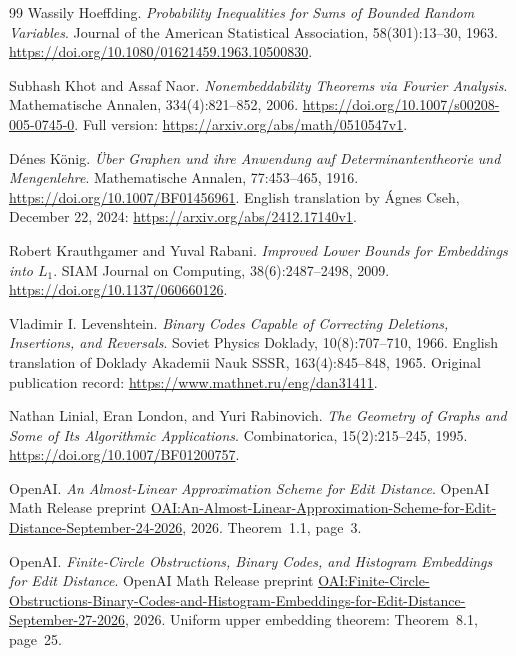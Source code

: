 \begin{thebibliography}{99}
Wassily Hoeffding.
\emph{Probability Inequalities for Sums of Bounded Random Variables}.
Journal of the American Statistical Association, 58(301):13--30, 1963.
\url{https://doi.org/10.1080/01621459.1963.10500830}.

Subhash Khot and Assaf Naor.
\emph{Nonembeddability Theorems via Fourier Analysis}.
Mathematische Annalen, 334(4):821--852, 2006.
\url{https://doi.org/10.1007/s00208-005-0745-0}.
Full version: \url{https://arxiv.org/abs/math/0510547v1}.

D\'enes K\"onig.
\emph{\"Uber Graphen und ihre Anwendung auf Determinantentheorie und Mengenlehre}.
Mathematische Annalen, 77:453--465, 1916.
\url{https://doi.org/10.1007/BF01456961}.
English translation by \'Agnes Cseh, December 22, 2024:
\url{https://arxiv.org/abs/2412.17140v1}.

Robert Krauthgamer and Yuval Rabani.
\emph{Improved Lower Bounds for Embeddings into $L_1$}.
SIAM Journal on Computing, 38(6):2487--2498, 2009.
\url{https://doi.org/10.1137/060660126}.

Vladimir I. Levenshtein.
\emph{Binary Codes Capable of Correcting Deletions, Insertions, and Reversals}.
Soviet Physics Doklady, 10(8):707--710, 1966.
English translation of Doklady Akademii Nauk SSSR, 163(4):845--848, 1965.
Original publication record:
\url{https://www.mathnet.ru/eng/dan31411}.

Nathan Linial, Eran London, and Yuri Rabinovich.
\emph{The Geometry of Graphs and Some of Its Algorithmic Applications}.
Combinatorica, 15(2):215--245, 1995.
\url{https://doi.org/10.1007/BF01200757}.

OpenAI.
\emph{An Almost-Linear Approximation Scheme for Edit Distance}.
OpenAI Math Release preprint
\href{https://github.com/openai/math/blob/main/preprints/An-Almost-Linear-Approximation-Scheme-for-Edit-Distance-September-24-2026/paper.pdf}{OAI:An-Almost-Linear-Approximation-Scheme-for-Edit-Distance-September-24-2026}, 2026.
Theorem~1.1, page~3.

OpenAI.
\emph{Finite-Circle Obstructions, Binary Codes, and Histogram Embeddings for Edit Distance}.
OpenAI Math Release preprint
\href{https://github.com/openai/math/blob/main/preprints/Finite-Circle-Obstructions-Binary-Codes-and-Histogram-Embeddings-for-Edit-Distance-September-27-2026/paper.pdf}{OAI:Finite-Circle-Obstructions-Binary-Codes-and-Histogram-Embeddings-for-Edit-Distance-September-27-2026}, 2026.
Uniform upper embedding theorem: Theorem~8.1, page~25.


\end{thebibliography}
